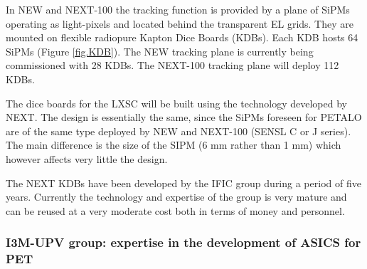 In NEW and NEXT-100 the tracking function is provided by a plane of SiPMs operating as light-pixels and located behind the transparent EL grids. They are mounted on flexible radiopure Kapton Dice Boards (KDBs). Each KDB hosts 64 SiPMs (Figure  \ref{fig.KDB}). The NEW  tracking plane is currently being commissioned with 28 KDBs. The NEXT-100 tracking plane will deploy 112 KDBs.  

The dice boards for the LXSC will be built using the technology developed by NEXT. The design is essentially the same, since the SiPMs foreseen for PETALO are of the same type deployed by NEW and NEXT-100 (SENSL C or J series). The main difference is the size of the SIPM (6 mm rather than 1 mm) which however affects very little the design. 

The NEXT KDBs have been developed by the IFIC group during a period of five years. Currently the technology and expertise of the group is very mature and can be reused at a very moderate cost both in terms of money and personnel. 


\subsubsection*{I3M-UPV group: expertise in the development of ASICS for PET}

